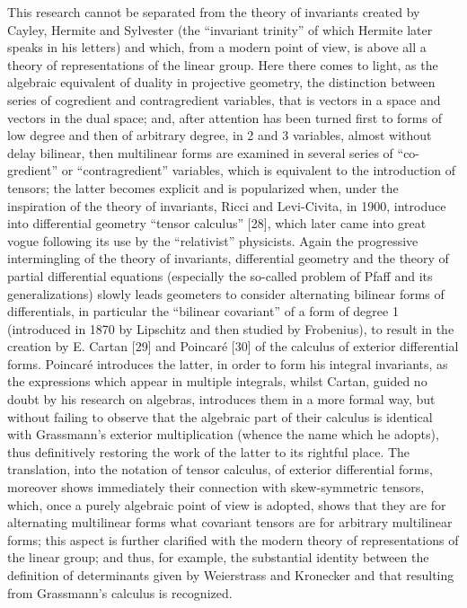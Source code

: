 This research cannot be separated from the theory of invariants created by Cayley, Hermite and Sylvester (the ``invariant trinity'' of which Hermite later speaks in his letters) and which, from a modern point of view, is above all a theory of representations of the linear group. Here there comes to light, as the algebraic equivalent of duality in projective geometry, the distinction between series of cogredient and contragredient variables, that is vectors in a space and vectors in the dual space; and, after attention has been turned first to forms of low degree and then of arbitrary degree, in 2 and 3 variables, almost without delay bilinear, then multilinear forms are examined in several series of ``co-gredient'' or ``contragredient'' variables, which is equivalent to the introduction of tensors; the latter becomes explicit and is popularized when, under the inspiration of the theory of invariants, Ricci and Levi-Civita, in 1900, introduce into differential geometry ``tensor calculus'' {[}28{]}, which later came into great vogue following its use by the ``relativist'' physicists. Again the progressive intermingling of the theory of invariants, differential geometry and the theory of partial differential equations (especially the so-called problem of Pfaff and its generalizations) slowly leads geometers to consider alternating bilinear forms of differentials, in particular the ``bilinear covariant'' of a form of degree 1 (introduced in 1870 by Lipschitz and then studied by Frobenius), to result in the creation by E. Cartan {[}29{]} and Poincaré {[}30{]} of the calculus of exterior differential forms. Poincaré introduces the latter, in order to form his integral invariants, as the expressions which appear in multiple integrals, whilst Cartan, guided no doubt by his research on algebras, introduces them in a more formal way, but without failing to observe that the algebraic part of their calculus is identical with Grassmann's exterior multiplication (whence the name which he adopts), thus definitively restoring the work of the latter to its rightful place. The translation, into the notation of tensor calculus, of exterior differential forms, moreover shows immediately their connection with skew-symmetric tensors, which, once a purely algebraic point of view is adopted, shows that they are for alternating multilinear forms what covariant tensors are for arbitrary multilinear forms; this aspect is further clarified with the modern theory of representations of the linear group; and thus, for example, the substantial identity between the definition of determinants given by Weierstrass and Kronecker and that resulting from Grassmann's calculus is recognized.

